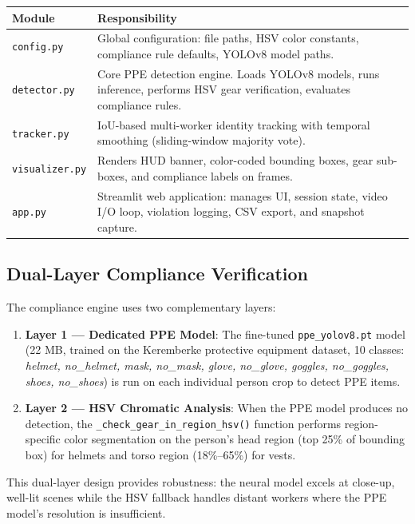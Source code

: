 \documentclass[12pt,a4paper]{report}
\begin{document}
\begin{center}
\renewcommand{\arraystretch}{1.4}
\begin{tabular}{|p{3.2cm}|p{8.5cm}|}
\hline
\textbf{Module} & \textbf{Responsibility} \\
\hline
\texttt{config.py} & Global configuration: file paths, HSV color constants, compliance rule defaults, YOLOv8 model paths. \\
\hline
\texttt{detector.py} & Core PPE detection engine. Loads YOLOv8 models, runs inference, performs HSV gear verification, evaluates compliance rules. \\
\hline
\texttt{tracker.py} & IoU-based multi-worker identity tracking with temporal smoothing (sliding-window majority vote). \\
\hline
\texttt{visualizer.py} & Renders HUD banner, color-coded bounding boxes, gear sub-boxes, and compliance labels on frames. \\
\hline
\texttt{app.py} & Streamlit web application: manages UI, session state, video I/O loop, violation logging, CSV export, and snapshot capture. \\
\hline
\end{tabular}
\end{center}

\subsection*{Dual-Layer Compliance Verification}
The compliance engine uses two complementary layers:

\begin{enumerate}
    \item \textbf{Layer 1 — Dedicated PPE Model}: The fine-tuned \texttt{ppe\_yolov8.pt} model (22 MB, trained on the Keremberke protective equipment dataset, 10 classes: \textit{helmet, no\_helmet, mask, no\_mask, glove, no\_glove, goggles, no\_goggles, shoes, no\_shoes}) is run on each individual person crop to detect PPE items.
    \item \textbf{Layer 2 — HSV Chromatic Analysis}: When the PPE model produces no detection, the \texttt{\_check\_gear\_in\_region\_hsv()} function performs region-specific color segmentation on the person's head region (top 25\% of bounding box) for helmets and torso region (18\%--65\%) for vests.
\end{enumerate}

This dual-layer design provides robustness: the neural model excels at close-up, well-lit scenes while the HSV fallback handles distant workers where the PPE model's resolution is insufficient.
\end{document}
